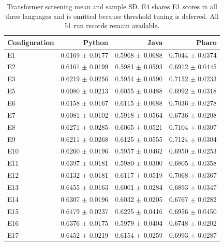 \begin{table}[htbp]
\centering\small
\caption{Transformer screening mean and sample SD. E4 shares E1 scores in all three languages and is omitted because threshold tuning is deferred. All 51 run records remain available.}\label{tab:dlcv}
\begin{tabular}{lrrr}\toprule
Configuration & Python & Java & Pharo\\\midrule
E1 & 0.6169 $\pm$ 0.0177 & 0.5968 $\pm$ 0.0688 & 0.7044 $\pm$ 0.0374\\
E2 & 0.6161 $\pm$ 0.0199 & 0.5981 $\pm$ 0.0593 & 0.6912 $\pm$ 0.0445\\
E3 & 0.6219 $\pm$ 0.0256 & 0.5954 $\pm$ 0.0590 & 0.7152 $\pm$ 0.0233\\
E5 & 0.6080 $\pm$ 0.0213 & 0.6055 $\pm$ 0.0488 & 0.6992 $\pm$ 0.0318\\
E6 & 0.6158 $\pm$ 0.0167 & 0.6115 $\pm$ 0.0688 & 0.7036 $\pm$ 0.0278\\
E7 & 0.6081 $\pm$ 0.0102 & 0.5918 $\pm$ 0.0564 & 0.6736 $\pm$ 0.0208\\
E8 & 0.6271 $\pm$ 0.0285 & 0.6065 $\pm$ 0.0521 & 0.7104 $\pm$ 0.0307\\
E9 & 0.6211 $\pm$ 0.0268 & 0.6125 $\pm$ 0.0555 & 0.7124 $\pm$ 0.0304\\
E10 & 0.6260 $\pm$ 0.0196 & 0.5957 $\pm$ 0.0462 & 0.6950 $\pm$ 0.0253\\
E11 & 0.6397 $\pm$ 0.0181 & 0.5980 $\pm$ 0.0300 & 0.6805 $\pm$ 0.0358\\
E12 & 0.6132 $\pm$ 0.0181 & 0.6117 $\pm$ 0.0519 & 0.7068 $\pm$ 0.0367\\
E13 & 0.6455 $\pm$ 0.0163 & 0.6001 $\pm$ 0.0284 & 0.6893 $\pm$ 0.0347\\
E14 & 0.6307 $\pm$ 0.0196 & 0.6032 $\pm$ 0.0205 & 0.6767 $\pm$ 0.0282\\
E15 & 0.6479 $\pm$ 0.0237 & 0.6225 $\pm$ 0.0416 & 0.6956 $\pm$ 0.0450\\
E16 & 0.6376 $\pm$ 0.0175 & 0.5979 $\pm$ 0.0404 & 0.6748 $\pm$ 0.0202\\
E17 & 0.6452 $\pm$ 0.0219 & 0.6154 $\pm$ 0.0259 & 0.6993 $\pm$ 0.0287\\
\bottomrule\end{tabular}
\end{table}
